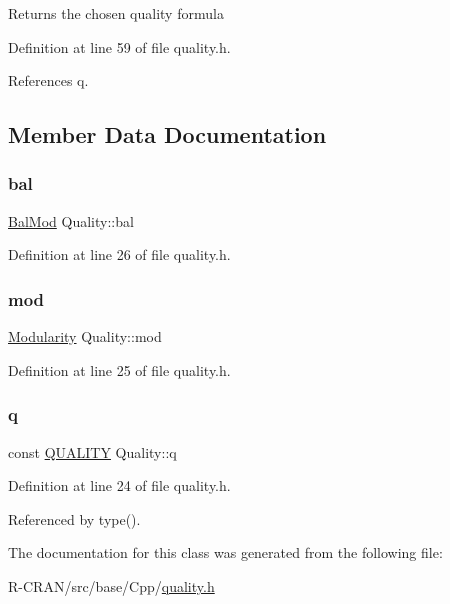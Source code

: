 \begin{DoxyReturn}{Returns}
the chosen quality formula 
\end{DoxyReturn}


Definition at line 59 of file quality.\+h.



References q.



\subsection{Member Data Documentation}
\mbox{\label{classQuality_a8fc813090a5cba20fac1936878627110}} 
\subsubsection{\texorpdfstring{bal}{bal}}
{\footnotesize\ttfamily \hyperlink{classBalMod}{Bal\+Mod} Quality\+::bal\hspace{0.3cm}{\ttfamily [private]}}



Definition at line 26 of file quality.\+h.

\mbox{\label{classQuality_a04fbfc618c695be31fd4340cac3982b5}} 
\subsubsection{\texorpdfstring{mod}{mod}}
{\footnotesize\ttfamily \hyperlink{classModularity}{Modularity} Quality\+::mod\hspace{0.3cm}{\ttfamily [private]}}



Definition at line 25 of file quality.\+h.

\mbox{\label{classQuality_ae709d894bf1d5e932f8cfde708811a45}} 
\subsubsection{\texorpdfstring{q}{q}}
{\footnotesize\ttfamily const \hyperlink{classQuality_ada8fae04627fbcaa8d41a1d42ae124df}{Q\+U\+A\+L\+I\+TY} Quality\+::q\hspace{0.3cm}{\ttfamily [private]}}



Definition at line 24 of file quality.\+h.



Referenced by type().



The documentation for this class was generated from the following file\+:\begin{DoxyCompactItemize}
\item 
R-\/\+C\+R\+A\+N/src/base/\+Cpp/\hyperlink{quality_8h}{quality.\+h}\end{DoxyCompactItemize}
